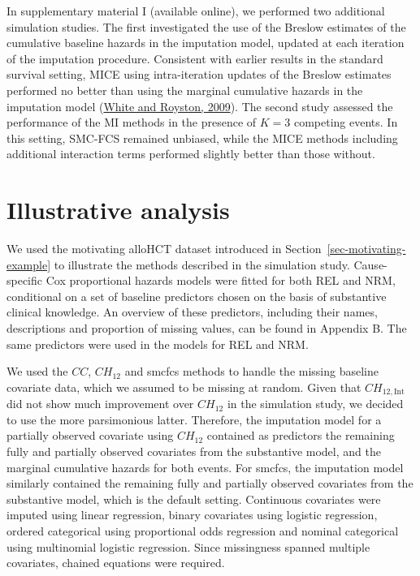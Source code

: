 \documentclass[
  letterpaper,
  DIV=11,
  numbers=noendperiod]{scrreprt}
\begin{document}
In supplementary material I (available online), we performed two
additional simulation studies. The first investigated the use of the
Breslow estimates of the cumulative baseline hazards in the imputation
model, updated at each iteration of the imputation procedure. Consistent
with earlier results in the standard survival setting, MICE using
intra-iteration updates of the Breslow estimates performed no better
than using the marginal cumulative hazards in the imputation model
(\protect\hyperlink{ref-whiteImputingMissingCovariate2009}{White and
Royston, 2009}). The second study assessed the performance of the MI
methods in the presence of \(K = 3\) competing events. In this setting,
SMC-FCS remained unbiased, while the MICE methods including additional
interaction terms performed slightly better than those without.

\hypertarget{sec-illust-analysis}{%
\section{Illustrative analysis}\label{sec-illust-analysis}}

We used the motivating alloHCT dataset introduced in
Section~\ref{sec-motivating-example} to illustrate the methods described
in the simulation study. Cause-specific Cox proportional hazards models
were fitted for both REL and NRM, conditional on a set of baseline
predictors chosen on the basis of substantive clinical knowledge. An
overview of these predictors, including their names, descriptions and
proportion of missing values, can be found in Appendix B. The same
predictors were used in the models for REL and NRM.

We used the \(CC\), \(CH_{12}\) and smcfcs methods to handle the missing
baseline covariate data, which we assumed to be missing at random. Given
that \(CH_{12,\text{Int}}\) did not show much improvement over
\(CH_{12}\) in the simulation study, we decided to use the more
parsimonious latter. Therefore, the imputation model for a partially
observed covariate using \(CH_{12}\) contained as predictors the
remaining fully and partially observed covariates from the substantive
model, and the marginal cumulative hazards for both events. For smcfcs,
the imputation model similarly contained the remaining fully and
partially observed covariates from the substantive model, which is the
default setting. Continuous covariates were imputed using linear
regression, binary covariates using logistic regression, ordered
categorical using proportional odds regression and nominal categorical
using multinomial logistic regression. Since missingness spanned
multiple covariates, chained equations were required.
\end{document}
